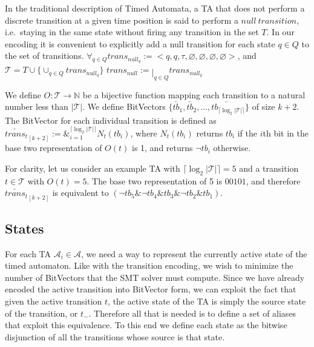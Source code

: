 \documentclass[a4paper,12pt]{article}
\newcommand*\BitAnd{\mathbin{\&}}
\newcommand*\BitOr{\mathbin{|}}
\begin{document}
In the traditional description of Timed Automata, a TA that does not perform a
discrete transition at a given time position is said to perform a \(null\
transition\), i.e.\ staying in the same state without firing any transition in
the set \(T\). In our encoding it is convenient to explicitly add a null
transition for each state \(q \in Q\) to the set of transitions. \(\forall_{q
\in Q} trans_{null_q} := {<}q, q, \tau, \varnothing, \varnothing, \varnothing,
\varnothing {>}\), and \(\mathcal{T} = T \cup \{\cup_{q \in Q}
trans_{null_q}\}\) \(trans_{null} := \BitOr_{q \in Q} trans_{null_q}\)

We define \(O: \mathcal{T} \rightarrow \mathbb{N}\) be a bijective
function mapping each transition to a natural number less than
\(|\mathcal{T}|\). We define BitVectors \(\{\overleftarrow{tb_1},
\overleftarrow{tb_2}, \ldots, \overleftarrow{tb_{\lceil
\log_2 |\mathcal{T}|\rceil}}\}\) of size \(k+2\). The BitVector for each
individual transition is defined as \(\overleftarrow{trans_t}_{[k+2]} :=
\BitAnd_{i=1}^{\lceil\log_2 |\mathcal{T}|\rceil} N_t(tb_i)\), where \(N_t(tb_i)\)
returns \(tb_i\) if the \(i\)th bit in the base two representation of \(O(t)\)
is 1, and returns \(\neg tb_i\) otherwise.

For clarity, let us consider an example TA with
\(\lceil\log_2 |\mathcal{T}|\rceil = 5\) and a transition \(t \in \mathcal{T}\)
with \(O(t) = 5\). The base two representation of 5 is \(00101\), and therefore
\(\overleftarrow{trans_t}_{[k+2]}\) is equivalent to \((\neg tb_5 \BitAnd
\neg tb_4 \BitAnd tb_3 \BitAnd \neg tb_2 \BitAnd tb_1)\).

\subsection{States}\label{encoding-states}

For each TA \(\mathcal{A}_i \in \mathcal{A}\), we need a way to represent the
currently active state of the timed automaton. Like with the transition
encoding, we wish to minimize the number of BitVectors that the SMT solver must
compute. Since we have already encoded the active transition into BitVector
form, we can exploit the fact that given the active transition \(t\), the active
state of the TA is simply the source state of the transition, or \(t_{-}\).
Therefore all that is needed is to define a set of aliases that exploit this
equivalence. To this end we define each state as the bitwise disjunction of all
the transitions whose source is that state.
\end{document}
